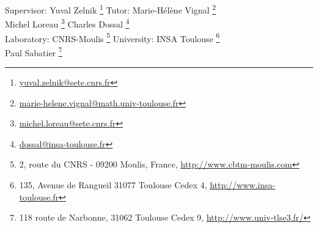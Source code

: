 \documentclass{article}
\begin{document}
\begin{titlepage}


\vspace*{1.9cm}

\begin{flushleft}
Supervisor: Yuval Zelnik \footnote{\url{yuval.zelnik@sete.cnrs.fr}} \hfill
Tutor: Marie-Hélène Vignal \footnote{\url{marie-helene.vignal@math.univ-toulouse.fr}} \\  
Michel Loreau \footnote{\url{michel.loreau@sete.cnrs.fr}} \hfill
Charles Dossal \footnote{\url{dossal@insa-toulouse.fr}} \\
Laboratory: CNRS-Moulis \footnote{2, route du CNRS - 09200 Moulis, France, \url{http://www.cbtm-moulis.com}} \hfill 
University: INSA Toulouse \footnote{135, Avenue de Rangueil 31077 Toulouse Cedex 4, \url{http://www.insa-toulouse.fr}} \\
\hfill Paul Sabatier \footnote{118 route de Narbonne, 31062 Toulouse Cedex 9, \url{http://www.univ-tlse3.fr/}}
\end{flushleft}


\end{titlepage}
\end{document}
